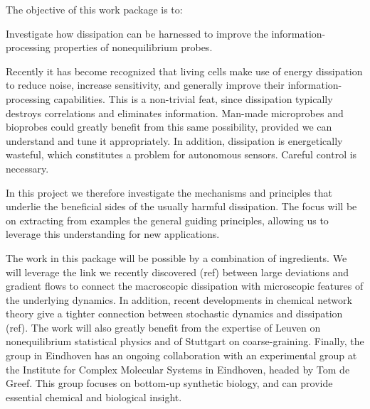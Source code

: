\begin{workpackage}[id=WPdissipation,wphases=0-48,
short=Dissipation,
title=Harnessing dissipation,
lead=TUE,
TUERM=36]

\begin{wpobjectives}
The objective of this work package is to:
\begin{compactitem}
\item Investigate how dissipation can be harnessed to improve the information-processing properties of nonequilibrium probes.
\end{compactitem}
\end{wpobjectives}

\begin{wpdescription}
Recently it has become recognized that living cells make use of energy dissipation to reduce noise, increase sensitivity, and generally improve their information-processing capabilities. This is a non-trivial feat, since dissipation typically destroys correlations and eliminates information. Man-made microprobes and bioprobes could greatly benefit from this same possibility, provided we can understand and tune it appropriately. In addition, dissipation is energetically wasteful, which constitutes a problem for autonomous sensors. Careful control is necessary. 

In this project we therefore investigate the mechanisms and principles that underlie the beneficial sides of the usually harmful dissipation. The focus will be on extracting from examples the general guiding principles, allowing us to leverage this understanding for new applications.

The work in this package will be possible by a combination of ingredients. We will leverage the link we recently discovered (ref) between large deviations and gradient flows to connect the macroscopic dissipation with microscopic features of the underlying dynamics. In addition, recent developments in chemical network theory give a tighter connection between stochastic dynamics and dissipation (ref). The work will also greatly benefit from the expertise of Leuven on nonequilibrium statistical physics and of Stuttgart on coarse-graining. 
Finally, the group in Eindhoven has an ongoing collaboration with an experimental group at the Institute for Complex Molecular Systems in Eindhoven, headed by Tom de Greef. This group focuses on bottom-up synthetic biology, and can provide essential chemical and biological insight. 


\end{wpdescription}
\end{workpackage}
